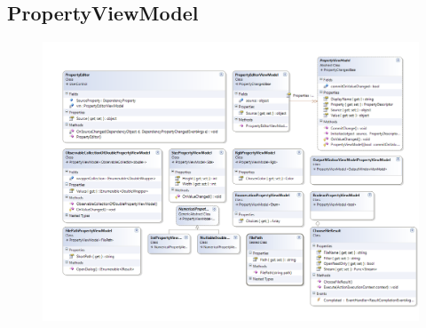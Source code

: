 \subsection{PropertyViewModel}
\begin{figure}[h!]
\begin{center}
\includegraphics[width=0.9\textheight,angle=90]{classdiagram/propertyeditorvm.png}
\end{center}
\end{figure}
\newpage